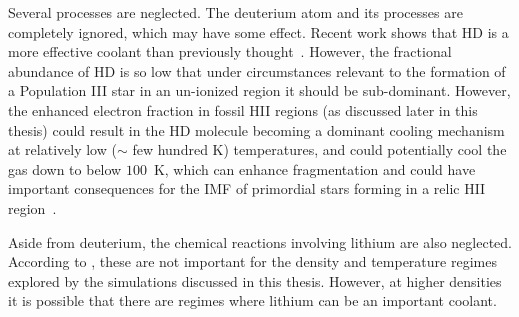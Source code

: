 Several processes are neglected.  The deuterium atom and its processes are 
completely ignored, which may have some effect.  Recent work shows that HD is
a more effective coolant than previously thought~\citep{2005MNRAS.361..850L}.  However,
the fractional abundance of HD is so low that under circumstances relevant to
the formation of a Population III star in an un-ionized region it should be
sub-dominant.  However, the enhanced electron fraction in fossil 
HII regions (as discussed later in this thesis) could result in the HD molecule
becoming a dominant cooling mechanism at relatively low ($\sim$ few hundred K)
temperatures, and could potentially cool the gas down to below $100$~K, which can
enhance fragmentation and could have important consequences for the IMF of 
primordial stars forming in a relic HII region~\citep{2005MNRAS.364.1378N}.

Aside from deuterium, the chemical reactions involving lithium 
are also neglected.  According to \citet{1998A&A...335..403G}, these are 
not important for the density and temperature regimes explored 
by the simulations discussed in this thesis.  However, at higher densities it 
is possible that there are regimes where lithium can be an important coolant.

